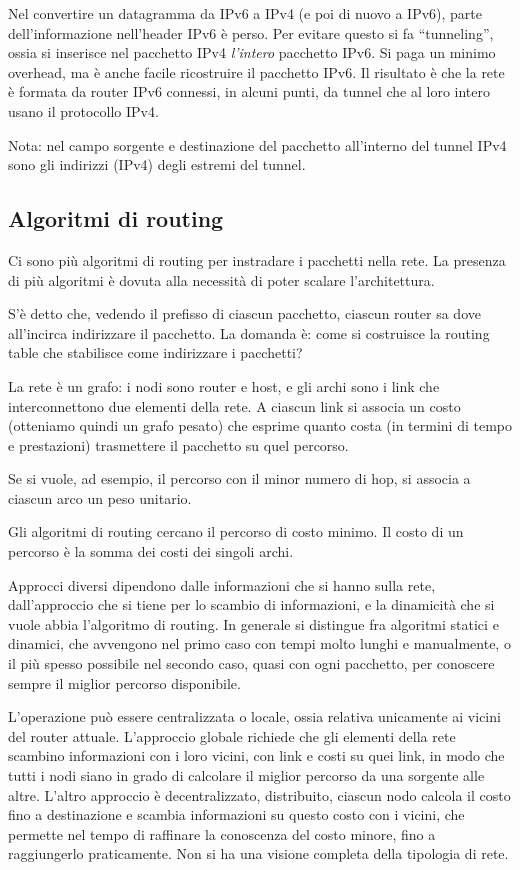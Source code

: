 Nel convertire un datagramma da IPv6 a IPv4 (e poi di nuovo a IPv6), parte dell'informazione nell'header IPv6 \`e perso. Per evitare questo si fa ``tunneling'', ossia si inserisce nel pacchetto IPv4 \emph{l'intero} pacchetto IPv6. Si paga un minimo overhead, ma \`e anche facile ricostruire il pacchetto IPv6. Il risultato \`e che la rete \`e formata da router IPv6 connessi, in alcuni punti, da tunnel che al loro intero usano il protocollo IPv4.

Nota: nel campo sorgente e destinazione del pacchetto all'interno del tunnel IPv4 sono gli indirizzi (IPv4) degli estremi del tunnel.

\subsection{Algoritmi di routing}

Ci sono pi\`u algoritmi di routing per instradare i pacchetti nella rete. La presenza di pi\`u algoritmi \`e dovuta alla necessit\`a di poter scalare l'architettura.

S'\`e detto che, vedendo il prefisso di ciascun pacchetto, ciascun router sa dove all'incirca indirizzare il pacchetto. La domanda \`e: come si costruisce la routing table che stabilisce come indirizzare i pacchetti?

La rete \`e un grafo: i nodi sono router e host, e gli archi sono i link che interconnettono due elementi della rete. A ciascun link si associa un costo (otteniamo quindi un grafo pesato) che esprime quanto costa (in termini di tempo e prestazioni) trasmettere il pacchetto su quel percorso.

Se si vuole, ad esempio, il percorso con il minor numero di hop, si associa a ciascun arco un peso unitario.

Gli algoritmi di routing cercano il percorso di costo minimo. Il costo di un percorso \`e la somma dei costi dei singoli archi.

Approcci diversi dipendono dalle informazioni che si hanno sulla rete, dall'approccio che si tiene per lo scambio di informazioni, e la dinamicit\`a che si vuole abbia l'algoritmo di routing. In generale si distingue fra algoritmi statici e dinamici, che avvengono nel primo caso con tempi molto lunghi e manualmente, o il pi\`u spesso possibile nel secondo caso, quasi con ogni pacchetto, per conoscere sempre il miglior percorso disponibile.

L'operazione pu\`o essere centralizzata o locale, ossia relativa unicamente ai vicini del router attuale. L'approccio globale richiede che gli elementi della rete scambino informazioni con i loro vicini, con link e costi su quei link, in modo che tutti i nodi siano in grado di calcolare il miglior percorso da una sorgente alle altre. L'altro approccio \`e decentralizzato, distribuito, ciascun nodo calcola il costo fino a destinazione e scambia informazioni su questo costo con i vicini, che permette nel tempo di raffinare la conoscenza del costo minore, fino a raggiungerlo praticamente. Non si ha una visione completa della tipologia di rete.


